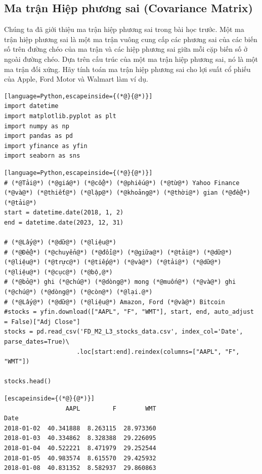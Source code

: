 \subsection{Ma trận Hiệp phương sai (Covariance Matrix)}

Chúng ta đã giới thiệu ma trận hiệp phương sai trong bài học trước. Một ma trận hiệp phương sai là một ma trận vuông cung cấp các phương sai của các biến số trên đường chéo của ma trận và các hiệp phương sai giữa mỗi cặp biến số ở ngoài đường chéo. Dựa trên cấu trúc của một ma trận hiệp phương sai, nó là một ma trận đối xứng. Hãy tính toán ma trận hiệp phương sai cho lợi suất cổ phiếu của Apple, Ford Motor và Walmart làm ví dụ.

\begin{lstlisting}[language=Python,escapeinside={(*@}{@*)}]
import datetime
import matplotlib.pyplot as plt
import numpy as np
import pandas as pd
import yfinance as yfin
import seaborn as sns
\end{lstlisting}

\begin{lstlisting}[language=Python,escapeinside={(*@}{@*)}]
# (*@Tải@*) (*@giá@*) (*@cổ@*) (*@phiếu@*) (*@từ@*) Yahoo Finance (*@và@*) (*@thiết@*) (*@lập@*) (*@khoảng@*) (*@thời@*) gian (*@để@*) (*@tải@*)
start = datetime.date(2018, 1, 2)
end = datetime.date(2023, 12, 31)

# (*@Lấy@*) (*@dữ@*) (*@liệu@*)
# (*@Để@*) (*@chuyển@*) (*@đổi@*) (*@giữa@*) (*@tải@*) (*@dữ@*) (*@liệu@*) (*@trực@*) (*@tiếp@*) (*@và@*) (*@tải@*) (*@dữ@*) (*@liệu@*) (*@cục@*) (*@bộ,@*) 
# (*@bỏ@*) ghi (*@chú@*) (*@dòng@*) mong (*@muốn@*) (*@và@*) ghi (*@chú@*) (*@dòng@*) (*@còn@*) (*@lại.@*)
# (*@Lấy@*) (*@dữ@*) (*@liệu@*) Amazon, Ford (*@và@*) Bitcoin
#stocks = yfin.download(["AAPL", "F", "WMT"], start, end, auto_adjust = False)["Adj Close"]
stocks = pd.read_csv('FD_M2_L3_stocks_data.csv', index_col='Date', parse_dates=True)\
                    .loc[start:end].reindex(columns=["AAPL", "F", "WMT"])

stocks.head()
\end{lstlisting}

\begin{lstlisting}[escapeinside={(*@}{@*)}]
                 AAPL         F        WMT
Date                                      
2018-01-02  40.341888  8.263115  28.973360
2018-01-03  40.334862  8.328388  29.226095
2018-01-04  40.522221  8.471979  29.252544
2018-01-05  40.983574  8.615570  29.425932
2018-01-08  40.831352  8.582937  29.860863
\end{lstlisting}

